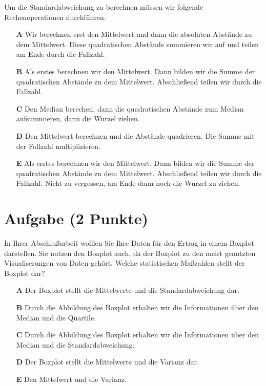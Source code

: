 \documentclass[a4paper, 9pt]{scrartcl}\usepackage[]{graphicx}\usepackage[]{xcolor}
\begin{document}
Um die Standardabweichung zu berechnen müssen wir folgende Rechenoperationen durchführen.



\begin{enumerate}
\item [\textbf{A} \msquare] Wir berechnen erst den Mittelwert und dann die absoluten Abstände zu dem Mittelwert. Diese quadratischen Abstände summieren wir auf und teilen am Ende durch die Fallzahl.
\item [\textbf{B} \msquare] Als erstes berechnen wir den Mittelwert. Dann bilden wir die Summe der quadratischen Abstände zu dem Mittelwert. Abschließend teilen wir durch die Fallzahl.
\item [\textbf{C} \msquare] Den Median berechen, dann die quadratischen Abstände zum Median aufsummieren, dann die Wurzel ziehen.
\item [\textbf{D} \msquare] Den Mittelwert berechnen und die Abstände quadrieren. Die Summe mit der Fallzahl multiplizieren.
\item [\textbf{E} \msquare] Als erstes berechnen wir den Mittelwert. Dann bilden wir die Summe der quadratischen Abstände zu dem Mittelwert. Abschließend teilen wir durch die Fallzahl. Nicht zu vergessen, am Ende dann noch die Wurzel zu ziehen.
\end{enumerate} 

\section{Aufgabe \hfill (2 Punkte)}



In Ihrer Abschlußarbeit wolllen Sie Ihre Daten für den Ertrag in einem Boxplot darstellen. Sie nutzen den Boxplot auch, da der Boxplot zu den meist genutzten Visualiserungen von Daten gehört. Welche statistischen Maßzahlen stellt der Boxplot dar?

 



\begin{enumerate}
\item [\textbf{A} \msquare] Der Boxplot stellt die Mittelwerte und die Standardabweichung dar.
\item [\textbf{B} \msquare] Durch die Abbildung des Boxplot erhalten wir die Informationen über den Median und die Quartile.
\item [\textbf{C} \msquare] Durch die Abbildung des Boxplot erhalten wir die Informationen über den Median und die Standardabweichung.
\item [\textbf{D} \msquare] Der Boxplot stellt die Mittelwerte und die Varianz dar.
\item [\textbf{E} \msquare] Den Mittelwert und die Varianz.
\end{enumerate}
\end{document}
